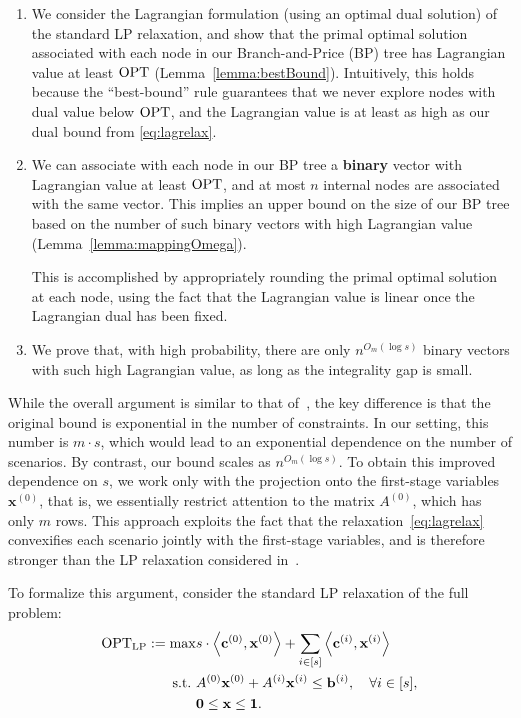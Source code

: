 \documentclass{article}
\newcommand{\cv}[0]{\mathbf{c}}
\newcommand{\xv}[0]{\mathbf{x}}
\newcommand{\bv}[0]{\mathbf{b}}
\newcommand{\iprod}[2]{\left\langle {#1}, {#2} \right\rangle}
\newcommand{\OPT}{\textup{OPT}}
\begin{document}
\begin{enumerate}
    \item We consider the Lagrangian formulation (using an optimal dual solution) of the standard LP relaxation, and show that the primal optimal solution associated with each node in our Branch-and-Price (BP) tree has Lagrangian value at least $\OPT$ (Lemma~\ref{lemma:bestBound}). Intuitively, this holds because the ``best-bound'' rule guarantees that we never explore nodes with dual value below $\OPT$, and the Lagrangian value is at least as high as our dual bound from \eqref{eq:lagrelax}.

    \item We can associate with each node in our BP tree a \textbf{binary} vector with Lagrangian value at least $\OPT$, and at most $n$ internal nodes are associated with the same vector. This implies an upper bound on the size of our BP tree based on the number of such binary vectors with high Lagrangian value (Lemma~\ref{lemma:mappingOmega}).

    This is accomplished by appropriately rounding the primal optimal solution at each node, using the fact that the Lagrangian value is linear once the Lagrangian dual has been fixed.

    \item We prove that, with high probability, there are only $n^{O_m(\log s)}$ binary vectors with such high Lagrangian value, as long as the integrality gap is small.
\end{enumerate}

While the overall argument is similar to that of~\cite{dey2021branch}, the key
difference is that the original bound is exponential in the number of
constraints. In our setting, this number is $m \cdot s$, which would lead to an
exponential dependence on the number of scenarios. By contrast, our bound
scales as $n^{O_m(\log s)}$.
To obtain this improved dependence on $s$, we work only with the projection onto
the first-stage variables $\xv^{(0)}$, that is, we essentially restrict
attention to the matrix $A^{(0)}$, which has only $m$ rows. This approach
exploits the fact that the relaxation~\eqref{eq:lagrelax} convexifies each
scenario jointly with the first-stage variables, and is therefore stronger than
the LP relaxation considered in~\cite{dey2021branch}.

\bigskip

To formalize this argument, consider the standard LP relaxation of the full problem:
\begin{subequations}
\label{prob_lp_relax}
\begin{align}
\OPT_{\text{LP}} := \max & s \cdot \iprod{\cv^{(0)}}{\xv^{(0)}} + \sum_{i \in [s]} \iprod{\cv^{(i)}}{\xv^{(i)}} \\
\label{eq:sub_LP_relax}
\text{s.t.}\ & A^{(0)} \xv^{(0)} + A^{(i)} \xv^{(i)} \leq \bv^{(i)},\quad \forall i \in [s], \\
& \textbf{0} \leq \xv \leq \textbf{1}. 
\end{align}
\end{subequations}
\end{document}
